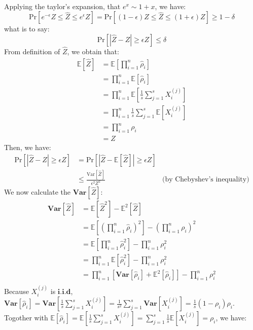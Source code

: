 \documentclass[12pt]{article}
\newenvironment{solution}[2][Solution]{\begin{trivlist}
\item[\hskip \labelsep {\bfseries #1}\hskip \labelsep {\bfseries #2.}]}{\end{trivlist}}
\begin{document}
\begin{solution}{3}
    ~\\
    Applying the taylor's expansion, that $e^x \sim 1+x$, we have:
    \[\mathrm{Pr}[e^{-\epsilon}Z \le \hat Z \le e^\epsilon Z] = \mathrm{Pr}[(1-\epsilon)Z \le \hat Z \le (1+\epsilon)Z] \ge 1-\delta\]
    what is to say:
    \[\mathrm{Pr}[|\hat Z - Z| \ge \epsilon Z] \le \delta\]
    From definition of $\hat Z$, we obtain that:
    \begin{align*}
        \mathbb{E}[\hat Z] & = \mathbb{E}[\prod_{i=1}^n \hat \rho_i] \\
        & = \prod_{i=1}^n\mathbb{E}[\hat \rho_i] \\
        & = \prod_{i=1}^n\mathbb{E}[\frac1s \sum_{j=1}^s X_i^{(j)}] \\
        & = \prod_{i=1}^n\frac1s \sum_{j=1}^s \mathbb{E}[X_i^{(j)}] \\
        & = \prod_{i=1}^n \rho_i \\
        & = Z
    \end{align*}
    Then, we have:
    \begin{align}
        \mathrm{Pr}[|\hat Z - Z| \ge \epsilon Z] & = \mathrm{Pr}[|\hat Z - \mathbb{E}[\hat Z]| \ge \epsilon Z] \\
        & \label{eqn2} \le \frac{\mathrm{Var}[\hat Z]}{\epsilon^2Z^2} & \text{(by Chebyshev's inequality)}
    \end{align}
    We now calculate the $\mathbf{Var}[\hat Z]$:
    \begin{align*}
        \mathbf{Var}[\hat Z] &= \mathbb{E}[\hat{Z}^2] - \mathbb{E}^2[\hat{Z}] \\
        & = \mathbb{E}[(\prod_{i=1}^n \hat \rho_i)^2] - (\prod_{i=1}^n \rho_i)^2 \\
        & = \mathbb{E}[\prod_{i=1}^n \hat \rho_i^2] - \prod_{i=1}^n \rho_i^2 \\
        & = \prod_{i=1}^n\mathbb{E}[ \hat \rho_i^2] - \prod_{i=1}^n \rho_i^2 \\
        & = \prod_{i=1}^n[\mathbf{Var}[\hat \rho_i] + \mathbb{E}^2[\hat \rho_i]] - \prod_{i=1}^n \rho_i^2 \\
    \end{align*}
    Because $X_i^{(j)}$ is $\mathbf{i.i.d}$, $\mathbf{Var}[\hat \rho_i] = \mathbf{Var}[\frac1s \sum_{j=1}^sX_i^{(j)}] = \frac1{s^2} \sum_{j=1}^s\mathbf{Var}[X_i^{(j)}] = \frac1s(1-\rho_i)\rho_i$.
    Togother with $\mathbb{E}[\hat \rho_i] = \mathbb{E}[\frac1s \sum_{j=1}^sX_i^{(j)}] = \sum_{j=1}^s\frac1s\mathbb{E}[ X_i^{(j)}] = \rho_i$, we have:

\end{solution}
\end{document}
